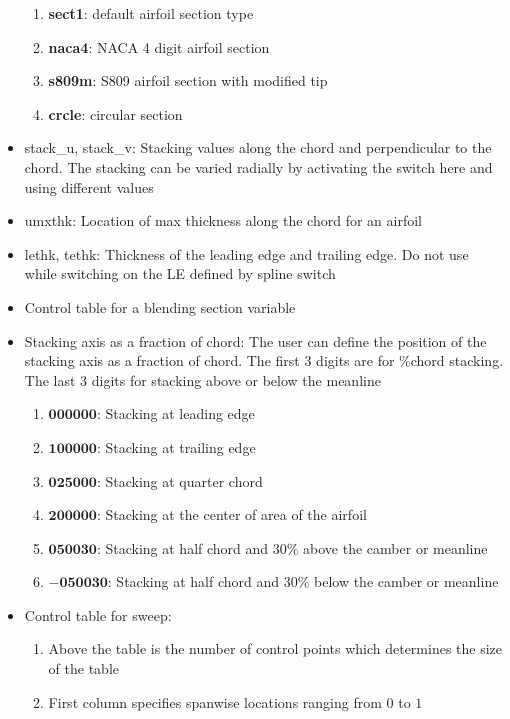 \documentclass[8pt]{article}
\begin{document}
\begin{itemize}[leftmargin=*]
    \begin{enumerate}[label=\alph*]
        \item \textbf{sect1}: default airfoil section type
        \item \textbf{naca4}: NACA 4 digit airfoil section
        \item \textbf{s809m}: S809 airfoil section with modified tip
        \item \textbf{crcle}: circular section
    \end{enumerate}
    \item stack\_u, stack\_v: Stacking values along the chord and perpendicular to the chord. The stacking can be varied radially by activating the switch here and using different values
    \item umxthk: Location of max thickness along the chord for an airfoil
    \item lethk, tethk: Thickness of the leading edge and trailing edge. Do not use while switching on the LE defined by spline switch
    \item Control table for a blending section variable
    \item Stacking axis as a fraction of chord: The user can define the position of the stacking axis as a fraction of chord. The first 3 digits are for \%chord stacking. The last 3 digits for stacking above or below the meanline
    \begin{enumerate}[label=\alph*]
        \item $\mathbf{000000}$: Stacking at leading edge
        \item $\mathbf{100000}$: Stacking at trailing edge
        \item $\mathbf{025000}$: Stacking at quarter chord
        \item $\mathbf{200000}$: Stacking at the center of area of the airfoil
        \item $\mathbf{050030}$: Stacking at half chord and $30\%$ above the camber or meanline
        \item $\mathbf{-050030}$: Stacking at half chord and $30\%$ below the camber or meanline
    \end{enumerate} 
    \item Control table for sweep:
    \begin{enumerate}[label=\alph*]
        \item Above the table is the number of control points which determines the size of the table
        \item First column specifies spanwise locations ranging from $0$ to $1$

\end{enumerate}
\end{itemize}
\end{document}
